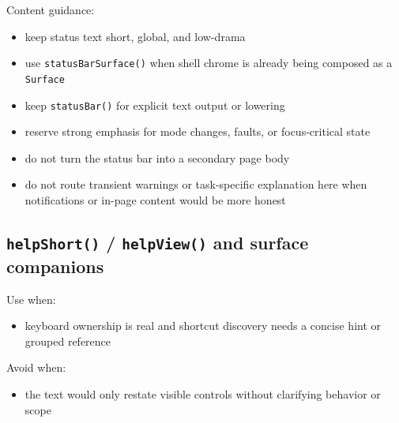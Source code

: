 Content guidance:

\begin{itemize}
\tightlist
\item
  keep status text short, global, and low-drama
\item
  use \texttt{s\allowbreak{}t\allowbreak{}a\allowbreak{}t\allowbreak{}u\allowbreak{}s\allowbreak{}B\allowbreak{}a\allowbreak{}r\allowbreak{}S\allowbreak{}u\allowbreak{}r\allowbreak{}f\allowbreak{}a\allowbreak{}c\allowbreak{}e\allowbreak{}(\allowbreak{})} when shell chrome is already being composed as a \texttt{S\allowbreak{}u\allowbreak{}r\allowbreak{}f\allowbreak{}a\allowbreak{}c\allowbreak{}e}
\item
  keep \texttt{s\allowbreak{}t\allowbreak{}a\allowbreak{}t\allowbreak{}u\allowbreak{}s\allowbreak{}B\allowbreak{}a\allowbreak{}r\allowbreak{}(\allowbreak{})} for explicit text output or lowering
\item
  reserve strong emphasis for mode changes, faults, or focus-critical state
\item
  do not turn the status bar into a secondary page body
\item
  do not route transient warnings or task-specific explanation here when notifications or in-page content would be more honest
\end{itemize}

\subsection{\texorpdfstring{\texttt{h\allowbreak{}e\allowbreak{}l\allowbreak{}p\allowbreak{}S\allowbreak{}h\allowbreak{}o\allowbreak{}r\allowbreak{}t\allowbreak{}(\allowbreak{})} / \texttt{h\allowbreak{}e\allowbreak{}l\allowbreak{}p\allowbreak{}V\allowbreak{}i\allowbreak{}e\allowbreak{}w\allowbreak{}(\allowbreak{})} and surface companions}{ /  and surface companions}}\label{record-023-helpshort-helpview-and-surface-companions}

Use when:

\begin{itemize}
\tightlist
\item
  keyboard ownership is real and shortcut discovery needs a concise hint or grouped reference
\end{itemize}

Avoid when:

\begin{itemize}
\tightlist
\item
  the text would only restate visible controls without clarifying behavior or scope
\end{itemize}

